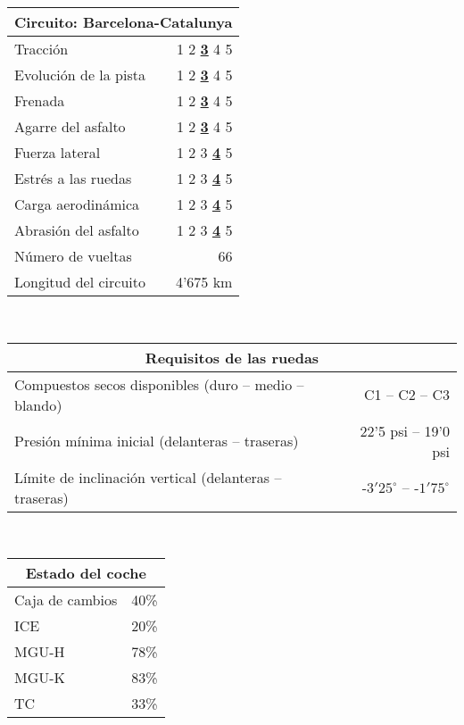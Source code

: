 \documentclass[12pt,a4paper,twoside,spanish]{article}      %
\begin{document}
\begin{table}[H]
    \centering
    \begin{tabular}{lr}
        \toprule
        \multicolumn{2}{c}{Circuito: \textbf{Barcelona-Catalunya}} \\ \midrule
        Tracción & 1 2 \underline{\textbf{3}} 4 5 \\
        Evolución de la pista & 1 2 \underline{\textbf{3}} 4 5 \\
        Frenada & 1 2 \underline{\textbf{3}} 4 5 \\
        Agarre del asfalto & 1 2 \underline{\textbf{3}} 4 5 \\
        Fuerza lateral & 1 2 3 \underline{\textbf{4}} 5 \\
        Estrés a las ruedas & 1 2 3 \underline{\textbf{4}} 5 \\
        Carga aerodinámica & 1 2 3 \underline{\textbf{4}} 5 \\
        Abrasión del asfalto & 1 2 3 \underline{\textbf{4}} 5 \\
        Número de vueltas & 66 \\
        Longitud del circuito & 4'675 km \\ \bottomrule
    \end{tabular} \\ \vspace{1em}
    \begin{tabular}{lr}
        \toprule
        \multicolumn{2}{c}{\textbf{Requisitos de las ruedas}} \\ \midrule
        Compuestos secos disponibles (duro -- medio -- blando) & C1 -- C2 -- C3 \\
        Presión mínima inicial (delanteras -- traseras) & 22'5 psi -- 19'0 psi \\
        Límite de inclinación vertical (delanteras -- traseras) & -$3'25^\circ$ -- -$1'75^\circ$ \\ \bottomrule
    \end{tabular} \\ \vspace{1em}
    \begin{tabular}{lr}
        \toprule
        \multicolumn{2}{c}{\textbf{Estado del coche}} \\ \midrule
        Caja de cambios & 40\% \\
        ICE & 20\% \\
        MGU-H & 78\% \\
        MGU-K & 83\% \\
        TC & 33\% \\

\end{tabular}
\end{table}
\end{document}
